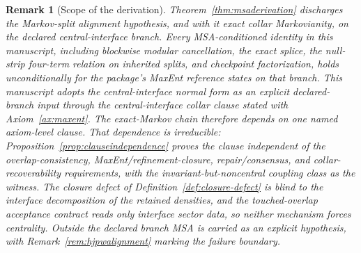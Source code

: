 \documentclass[11pt]{article}
\newtheorem{remark}[theorem]{Remark}
\begin{document}
\begin{remark}[Scope of the derivation]\label{rem:msascope}
Theorem~\ref{thm:msaderivation} discharges the Markov-split alignment hypothesis, and with it exact collar Markovianity, on the declared central-interface branch. Every MSA-conditioned identity in this manuscript, including blockwise modular cancellation, the exact splice, the null-strip four-term relation on inherited splits, and checkpoint factorization, holds unconditionally for the package's MaxEnt reference states on that branch. This manuscript adopts the central-interface normal form as an explicit declared-branch input through the central-interface collar clause stated with Axiom~\ref{ax:maxent}. The exact-Markov chain therefore depends on one named axiom-level clause. That dependence is irreducible: Proposition~\ref{prop:clauseindependence} proves the clause independent of the overlap-consistency, MaxEnt/refinement-closure, repair/consensus, and collar-recoverability requirements, with the invariant-but-noncentral coupling class as the witness. The closure defect of Definition~\ref{def:closure-defect} is blind to the interface decomposition of the retained densities, and the touched-overlap acceptance contract reads only interface sector data, so neither mechanism forces centrality. Outside the declared branch MSA is carried as an explicit hypothesis, with Remark~\ref{rem:hjpwalignment} marking the failure boundary.
\end{remark}
\end{document}
